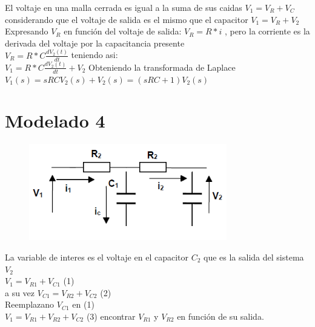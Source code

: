 \documentclass[
	12pt, %
]{fphw}
\begin{document}
El voltaje en una malla cerrada es igual a la suma de sus caidas $V_{1} = V_{R} + V_{C}$ considerando que el voltaje de salida es el mismo que el capacitor $V_{1} = V_{R} + V_{2}$ \\

Expresando $V_{R}$ en función del voltaje de salida: $V_{R} = R*i$ , pero la corriente es la derivada del voltaje por la capacitancia presente \\

$V_{R} = R*C \frac{d V_{2}(t)}{dt}$ teniendo asi: \\

$V_{1} = R*C \frac{d V_{2}(t)}{dt} + V_{2}$ Obteniendo la transformada de Laplace \\

$V_{1}(s) = sRCV_{2}(s)+V_{2}(s) = (sRC+1)V_{2}(s)$ \\


\newpage
\section*{{\color{Apricot}Modelado 4}}

\begin{figure}[H]
  \centering
  \includegraphics[scale=0.6]{images/p4.png}
\end{figure}

La variable de interes es el voltaje en el capacitor $C_{2}$ que es la salida del sistema $V_{2}$ \\

$V_{1} = V_{R1} + V_{C1}$ (1) \\

a su vez $V_{C1} = V_{R2} + V_{C2}$ (2) \\

Reemplazano $V_{C1}$ en (1) \\

$V_{1} = V_{R1} + V_{R2} + V_{C2}$ (3) encontrar $V_{R1}$ y $V_{R2}$ en función de su salida. \\
\end{document}
